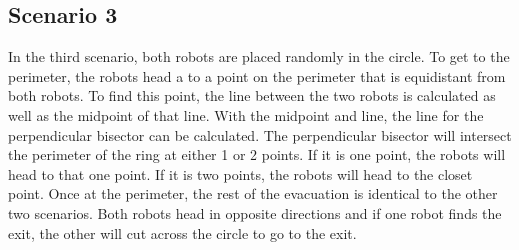 \documentclass[12pt,letterpaper]{article}
\begin{document}
%         
%         
        \begin{center}
        \end{center}
    
    \subsection{Scenario 3}
        In the third scenario, both robots are placed randomly in the circle. To get to the perimeter, the robots head a to a point on the perimeter that is equidistant from both robots. To find this point, the line between the two robots is calculated as well as the midpoint of that line. With the midpoint and line, the line for the perpendicular bisector can be calculated. The perpendicular bisector will intersect the perimeter of the ring at either 1 or 2 points. If it is one point, the robots will head to that one point. If it is two points, the robots will head to the closet point. Once at the perimeter, the rest of the evacuation is identical to the other two scenarios. Both robots head in opposite directions and if one robot finds the exit, the other will cut across the circle to go to the exit.
        
\end{document}
